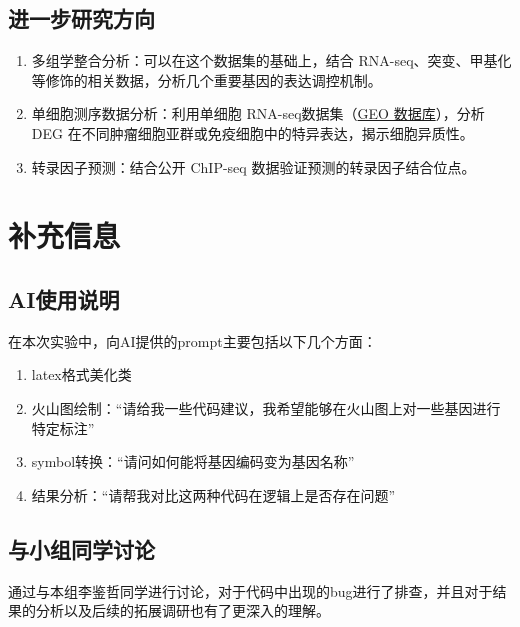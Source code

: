 \documentclass{article}
\begin{document}
\subsection{进一步研究方向}

\begin{enumerate}
    \item 多组学整合分析：可以在这个数据集的基础上，结合 RNA-seq、突变、甲基化等修饰的相关数据，分析几个重要基因的表达调控机制。
    \item 单细胞测序数据分析：利用单细胞 RNA-seq数据集（\href{https://www.ncbi.nlm.nih.gov/gds}{GEO 数据库}），分析 DEG 在不同肿瘤细胞亚群或免疫细胞中的特异表达，揭示细胞异质性。
    \item 转录因子预测：结合公开 ChIP-seq 数据验证预测的转录因子结合位点。
\end{enumerate}

\section{补充信息}

\subsection{AI使用说明}

在本次实验中，向AI提供的prompt主要包括以下几个方面：

\begin{enumerate}
    \item latex格式美化类
    \item 火山图绘制：“请给我一些代码建议，我希望能够在火山图上对一些基因进行特定标注”
    \item symbol转换：“请问如何能将基因编码变为基因名称”
    \item 结果分析：“请帮我对比这两种代码在逻辑上是否存在问题”
\end{enumerate}

\subsection{与小组同学讨论}

通过与本组李鉴哲同学进行讨论，对于代码中出现的bug进行了排查，并且对于结果的分析以及后续的拓展调研也有了更深入的理解。
\end{document}
